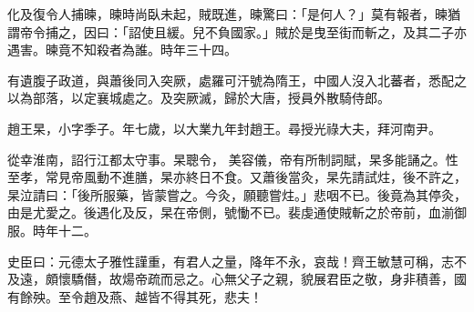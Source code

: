 \begin{pinyinscope}
 化及復令人捕暕，暕時尚臥未起，賊既進，暕驚曰：「是何人？」莫有報者，暕猶謂帝令捕之，因曰：「詔使且緩。兒不負國家。」賊於是曳至街而斬之，及其二子亦遇害。暕竟不知殺者為誰。時年三十四。



 有遺腹子政道，與蕭後同入突厥，處羅可汗號為隋王，中國人沒入北蕃者，悉配之以為部落，以定襄城處之。及突厥滅，歸於大唐，授員外散騎侍郎。



 趙王杲，小字季子。年七歲，以大業九年封趙王。尋授光祿大夫，拜河南尹。



 從幸淮南，詔行江都太守事。杲聰令，
 美容儀，帝有所制詞賦，杲多能誦之。性至孝，常見帝風動不進膳，杲亦終日不食。又蕭後當灸，杲先請試炷，後不許之，杲泣請曰：「後所服藥，皆蒙嘗之。今灸，願聽嘗炷。」悲咽不已。後竟為其停灸，由是尤愛之。後遇化及反，杲在帝側，號慟不已。裴虔通使賊斬之於帝前，血湔御服。時年十二。



 史臣曰：元德太子雅性謹重，有君人之量，降年不永，哀哉！齊王敏慧可稱，志不及遠，頗懷驕僭，故煬帝疏而忌之。心無父子之親，貌展君臣之敬，身非積善，國有餘殃。至令趙及燕、越皆不得其死，悲夫！



\end{pinyinscope}